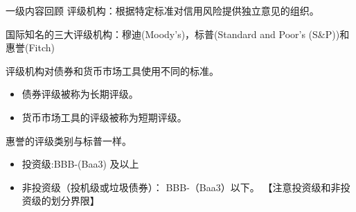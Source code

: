 \begin{itemize}
\begin{knowledgebox}{一级内容回顾}
    评级机构：根据特定标准对信用风险提供独立意见的组织。

    国际知名的三大评级机构：穆迪(Moody's)，标普(Standard and Poor's (S\&P))和惠誉(Fitch)

    评级机构对债券和货币市场工具使用不同的标准。
    
    \begin{itemize}
        \item 债券评级被称为长期评级。
        \item  货币市场工具的评级被称为短期评级。
        \end{itemize}

    惠誉的评级类别与标普一样。
    \begin{itemize}
        \item 投资级:BBB-(Baa3) 及以上

        \item 非投资级（投机级或垃圾债券）： BBB-（Baa3）以下。  
        【注意投资级和非投资级的划分界限】
        \end{itemize}
        


\end{knowledgebox}
\end{itemize}
